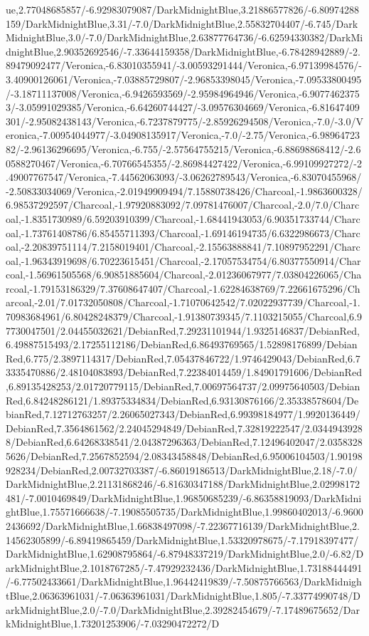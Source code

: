 {\begin{tikzternal}
ue,2.77048685857/-6.92983079087/DarkMidnightBlue,3.21886577826/-6.80974288159/DarkMidnightBlue,3.31/-7.0/DarkMidnightBlue,2.55832704407/-6.745/DarkMidnightBlue,3.0/-7.0/DarkMidnightBlue,2.63877764736/-6.62594330382/DarkMidnightBlue,2.90352692546/-7.33644159358/DarkMidnightBlue,-6.78428942889/-2.89479092477/Veronica,-6.83010355941/-3.00593291444/Veronica,-6.97139984576/-3.40900126061/Veronica,-7.03885729807/-2.96853398045/Veronica,-7.09533800495/-3.18711137008/Veronica,-6.9426593569/-2.95984964946/Veronica,-6.90774623753/-3.05991029385/Veronica,-6.64260744427/-3.09576304669/Veronica,-6.81647409301/-2.95082438143/Veronica,-6.7237879775/-2.85926294508/Veronica,-7.0/-3.0/Veronica,-7.00954044977/-3.04908135917/Veronica,-7.0/-2.75/Veronica,-6.9896472382/-2.96136296695/Veronica,-6.755/-2.57564755215/Veronica,-6.88698868412/-2.60588270467/Veronica,-6.70766545355/-2.86984427422/Veronica,-6.99109927272/-2.49007767547/Veronica,-7.44562063093/-3.06262789543/Veronica,-6.83070455968/-2.50833034069/Veronica,-2.01949909494/7.15880738426/Charcoal,-1.9863600328/6.98537292597/Charcoal,-1.97920883092/7.09781476007/Charcoal,-2.0/7.0/Charcoal,-1.8351730989/6.59203910399/Charcoal,-1.68441943053/6.90351733744/Charcoal,-1.73761408786/6.85455711393/Charcoal,-1.69146194735/6.6322986673/Charcoal,-2.20839751114/7.2158019401/Charcoal,-2.15563888841/7.10897952291/Charcoal,-1.96343919698/6.70223615451/Charcoal,-2.17057534754/6.80377550914/Charcoal,-1.56961505568/6.90851885604/Charcoal,-2.01236067977/7.03804226065/Charcoal,-1.79153186329/7.37608647407/Charcoal,-1.62284638769/7.22661675296/Charcoal,-2.01/7.01732050808/Charcoal,-1.71070642542/7.02022937739/Charcoal,-1.70983684961/6.80428248379/Charcoal,-1.91380739345/7.1103215055/Charcoal,6.97730047501/2.04455032621/DebianRed,7.29231101944/1.9325146837/DebianRed,6.49887515493/2.17255112186/DebianRed,6.86493769565/1.52898176899/DebianRed,6.775/2.3897114317/DebianRed,7.05437846722/1.9746429043/DebianRed,6.73335470886/2.48104083893/DebianRed,7.22384014459/1.84901791606/DebianRed,6.89135428253/2.01720779115/DebianRed,7.00697564737/2.09975640503/DebianRed,6.84248286121/1.89375334834/DebianRed,6.93130876166/2.35338578604/DebianRed,7.12712763257/2.26065027343/DebianRed,6.99398184977/1.9920136449/DebianRed,7.3564861562/2.24045294849/DebianRed,7.32819222547/2.03449439288/DebianRed,6.64268338541/2.04387296363/DebianRed,7.12496402047/2.03583285626/DebianRed,7.2567852594/2.08343458848/DebianRed,6.95006104503/1.90198928234/DebianRed,2.00732703387/-6.86019186513/DarkMidnightBlue,2.18/-7.0/DarkMidnightBlue,2.21131868246/-6.81630347188/DarkMidnightBlue,2.02998172481/-7.0010469849/DarkMidnightBlue,1.96850685239/-6.86358819093/DarkMidnightBlue,1.75571666638/-7.19085505735/DarkMidnightBlue,1.99860402013/-6.96002436692/DarkMidnightBlue,1.66838497098/-7.22367716139/DarkMidnightBlue,2.14562305899/-6.89419865459/DarkMidnightBlue,1.53320978675/-7.17918397477/DarkMidnightBlue,1.62908795864/-6.87948337219/DarkMidnightBlue,2.0/-6.82/DarkMidnightBlue,2.1018767285/-7.47929232436/DarkMidnightBlue,1.73188444491/-6.77502433661/DarkMidnightBlue,1.96442419839/-7.50875766563/DarkMidnightBlue,2.06363961031/-7.06363961031/DarkMidnightBlue,1.805/-7.33774990748/DarkMidnightBlue,2.0/-7.0/DarkMidnightBlue,2.39282454679/-7.17489675652/DarkMidnightBlue,1.73201253906/-7.03290472272/D
\end{tikzternal}}
